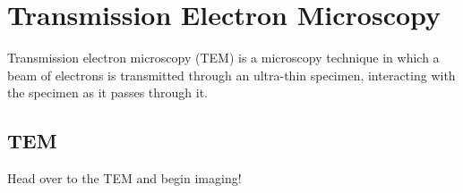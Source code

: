 \section{Transmission Electron Microscopy}
Transmission electron microscopy (TEM) is a microscopy technique in which a beam of electrons is transmitted through an ultra-thin specimen, interacting with the specimen as it passes through it.
\subsection{TEM}
Head over to the TEM and begin imaging!
